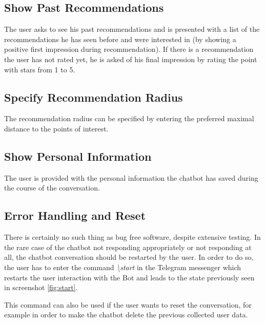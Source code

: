 \subsection{Show Past Recommendations}
The user asks to see his past recommendations and is presented with a list of the recommendations he has seen before and were interested in (by showing a positive first impression during recommendation). If there is a recommendation the user has not rated yet, he is asked of his final impression by rating the point with stars from 1 to 5.

\subsection{Specify Recommendation Radius}
The recommendation radius can be specified by entering the preferred maximal distance to the points of interest.

\subsection{Show Personal Information}
The user is provided with the personal information the chatbot has saved during the course of the conversation.
 

\subsection{Error Handling and Reset}
There is certainly no such thing as bug free software, despite extensive testing. In the rare case of the chatbot not responding appropriately or not responding at all, the chatbot conversation should be restarted by the user. In order to do so, the user has to enter the command \textit{\textbackslash{}start} in the Telegram messenger which restarts the user interaction with the Bot and leads to the state previously seen in screenshot \ref{fig:start}.

This command can also be used if the user wants to reset the conversation, for example in order to make the chatbot delete the previous collected user data.

